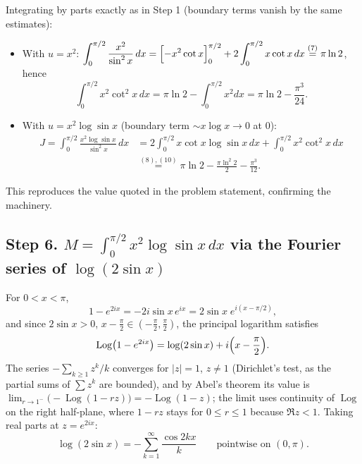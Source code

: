 \documentclass[11pt]{article}
\theoremstyle{remark}
\begin{document}
Integrating by parts exactly as in Step 1 (boundary terms vanish by the same estimates):

\begin{itemize}
\item With $u=x^{2}$: $\displaystyle\int_0^{\pi/2}\frac{x^{2}}{\sin^{2}x}\,dx
=\Bigl[-x^{2}\cot x\Bigr]_0^{\pi/2}+2\int_0^{\pi/2}x\cot x\,dx
\overset{(7)}{=}\pi\ln 2$, hence
\begin{equation}\int_0^{\pi/2}x^{2}\cot^{2}x\,dx=\pi\ln 2-\int_0^{\pi/2}x^{2}dx=\pi\ln 2-\frac{\pi^{3}}{24}. \tag{10}\end{equation}

\item With $u=x^{2}\log\sin x$ (boundary term $\sim x\log x\to0$ at $0$):
\begin{equation}\begin{aligned}
J=\int_0^{\pi/2}\frac{x^{2}\log\sin x}{\sin^{2}x}\,dx
&=2\int_0^{\pi/2}x\cot x\log\sin x\,dx+\int_0^{\pi/2}x^{2}\cot^{2}x\,dx\\
&\overset{(8),(10)}{=}\pi\ln 2-\frac{\pi\ln^{2}2}{2}-\frac{\pi^{3}}{12}.
\end{aligned}\tag{11}\end{equation}
\end{itemize}

This reproduces the value quoted in the problem statement, confirming the machinery.

\subsection*{Step 6. $M=\displaystyle\int_0^{\pi/2}x^{2}\log\sin x\,dx$ via the Fourier series of $\log(2\sin x)$}

For $0<x<\pi$,
$$1-e^{2ix}=-2i\sin x\,e^{ix}=2\sin x\;e^{i(x-\pi/2)},$$
and since $2\sin x>0$, $x-\frac{\pi}{2}\in(-\frac{\pi}{2},\frac{\pi}{2})$, the principal logarithm satisfies
$$\operatorname{Log}\bigl(1-e^{2ix}\bigr)=\log(2\sin x)+i\Bigl(x-\frac{\pi}{2}\Bigr).$$
The series $-\sum_{k\ge1}z^{k}/k$ converges for $|z|=1$, $z\ne1$ (Dirichlet's test, as the partial sums of $\sum z^{k}$ are bounded), and by Abel's theorem its value is $\lim_{r\to1^{-}}\bigl(-\operatorname{Log}(1-rz)\bigr)=-\operatorname{Log}(1-z)$; the limit uses continuity of $\operatorname{Log}$ on the right half-plane, where $1-rz$ stays for $0\le r\le1$ because $\Re z<1$. Taking real parts at $z=e^{2ix}$:
\begin{equation}\log(2\sin x)=-\sum_{k=1}^{\infty}\frac{\cos 2kx}{k}\qquad\text{pointwise on }(0,\pi). \tag{12}\end{equation}
\end{document}
